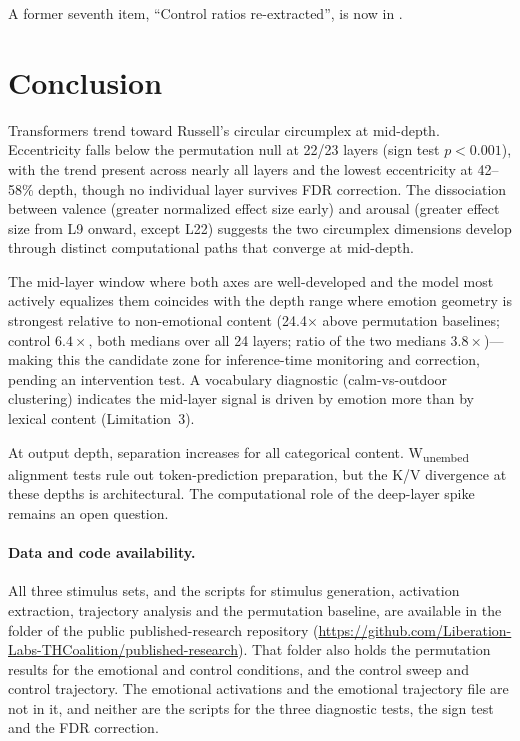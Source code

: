 \documentclass[11pt,a4paper]{article}
\begin{document}
\noindent A former seventh item, ``Control ratios re-extracted'', is now in
.

\section{Conclusion}
\label{sec:conclusion}

Transformers trend toward Russell's circular circumplex at mid-depth.
Eccentricity falls below the permutation null at 22/23 layers (sign test
$p < 0.001$), with the trend present across nearly all layers and the
lowest eccentricity at 42--58\% depth, though no individual layer
survives FDR correction. The dissociation
between valence (greater normalized effect size early) and arousal
(greater effect size from L9 onward, except L22) suggests the two circumplex dimensions
develop through distinct computational paths that converge at mid-depth.

The mid-layer window where both axes are well-developed and the model
most actively equalizes them coincides with the depth range where emotion
geometry is strongest relative to non-emotional content (24.4$\times$
above permutation baselines; control $6.4\times$, both medians over all 24 layers;
ratio of the two medians $3.8\times$)---making this the candidate zone for inference-time
monitoring and correction, pending an intervention test. A vocabulary diagnostic (calm-vs-outdoor
clustering) indicates the mid-layer signal is driven by emotion more
than by lexical content (Limitation~3).

At output depth, separation increases for all categorical content.
W\textsubscript{unembed} alignment tests rule out token-prediction
preparation, but the K/V divergence at these depths is architectural.
The computational role of the deep-layer spike remains an open question.

\paragraph{Data and code availability.}
\sloppy
All three stimulus sets, and the scripts for stimulus generation,
activation extraction, trajectory analysis and the permutation baseline,
are available in the  folder of the
public published-research repository
(\url{https://github.com/Liberation-Labs-THCoalition/published-research}).
That folder also holds the permutation results for the emotional and
control conditions, and the control sweep and control trajectory. The
emotional activations and the emotional trajectory file are not in it,
and neither are the scripts for the three diagnostic tests, the sign
test and the FDR correction.\par\fussy
\end{document}
